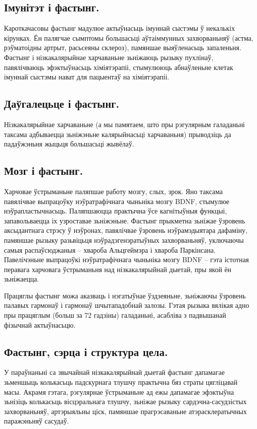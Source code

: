 \subsection{Імунітэт і фастынг.}
Кароткачасовы фастынг мадулюе актыўнасьць імуннай сыстэмы ў некалькіх кірунках. Ён палягчае сымптомы большасьці аўтаіммунных захворваньняў (астма, рэўматоідны артрыт, расьсеяны склероз), памяншае выяўленасьць запаленьня. Фастынг і нізкакалярыйнае харчаваньне зьніжаюць рызыку пухлінаў, павялічваюць эфэктыўнасьць хіміятэрапіі, стымулююць абнаўленьне клетак імуннай сыстэмы нават для пацыентаў на хіміятэрапіі.

\subsection{Даўгалецьце і фастынг.}
Нізкакалярыйнае харчаваньне (а мы памятаем, што пры рэгулярным галаданьні таксама адбываецца зьніжэньне калярыйнасьці харчаваньня) прыводзіць да падаўжэньня жыцьця большасьці жывёлаў.

\subsection{Мозг і фастынг.}
Харчовае ўстрыманьне паляпшае работу мозгу, слых, зрок. Яно таксама павялічвае выпрацоўку нэўратрафічнага чыньніка мозгу BDNF, стымулюе нэўрапластычнасьць. Паляпшаюцца практычна ўсе кагнітыўныя функцыі, запавольваецца іх узроставае зьніжэньне. Фастынг прыкметна зьніжае ўзровень аксыдантнага стрэсу ў нэўронах, павялічвае ўзровень нэўрамэдыятара дафаміну, памяншае рызыку разьвіцьця нэўрадэгенэратыўных захворваньняў, уключаючы самыя распаўсюджаныя – хвароба Альцгеймэра і хвароба Паркінсана. Павелічэньне выпрацоўкі нэўратрафічнага чыньніка мозгу BDNF – гэта істотная перавага харчовага ўстрыманьня над нізкакалярыйнай дыетай, пры якой ён зьніжаецца.

Працяглы фастынг можа аказваць і нэгатыўнае ўздзеяньне, зьніжаючы ўзровень палавых гармонаў і гармонаў шчытападобнай залозы. Гэтая рызыка вялікая адно пры працяглым (больш за 72 гадзіны) галаданьні, асабліва з падвышанай фізычнай актыўнасьцю.

\subsection{Фастынг, сэрца і структура цела.}
У параўнаньні са звычайнай нізкакалярыйнай дыетай фастынг дапамагае зьменшыць колькасьць падскурнага тлушчу практычна бяз страты цягліцавай масы. Акрамя гэтага, рэгулярнае ўстрыманьне ад ежы дапамагае эфэктыўна зьнізіць колькасьць вісцэральнага тлушчу, зьніжае рызыку сардэчна-сасудзістых захворваньняў, артэрыяльны ціск, памяншае прагрэсаваньне атэрасклератычных паражэньняў сасудаў.

